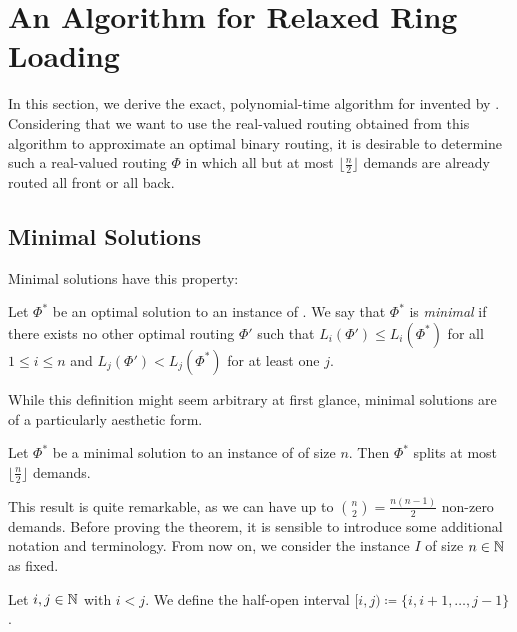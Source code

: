 \section{An Algorithm for Relaxed Ring Loading}
\label{sec:relaxed-ring-loading}

In this section, we derive the exact, polynomial-time algorithm for \RRL invented by \citet{schrijver99}.
Considering that we want to use the real-valued routing obtained from this algorithm to approximate an optimal binary routing, it is desirable to determine such a real-valued routing $\Phi$ in which all but at most $\lfloor \frac{n}{2} \rfloor$ demands are already routed all front or all back.

\subsection{Minimal Solutions}

Minimal solutions have this property:

\begin{definition}
	Let $\Phi^\ast$ be an optimal solution to an instance of \RRL.
	We say that $\Phi^\ast$ is \emph{minimal} if there exists no other optimal routing $\Phi'$ such that $L_i(\Phi') \leq L_i(\Phi^\ast)$ for all $1 \leq i \leq n$ and $L_j(\Phi') < L_j(\Phi^\ast)$ for at least one $j$.
\end{definition}
While this definition might seem arbitrary at first glance, minimal solutions are of a particularly aesthetic form.

\begin{theorem}
	\label{theo:number-of-splits}
	Let $\Phi^\ast$ be a minimal solution to an instance of \RRL of size $n$.
	Then $\Phi^\ast$ splits at most $\lfloor \frac{n}{2} \rfloor$ demands.
\end{theorem}

This result is quite remarkable, as we can have up to $\binom{n}{2} = \frac{n(n-1)}{2}$ non-zero demands.
Before proving the theorem, it is sensible to introduce some additional notation and terminology.
From now on, we consider the \RRL instance $I$ of size $n \in \mathbb{N}$ as fixed.
\begin{notation}
	Let $i, j \in \mathbb{N}$ with $i < j$.
	We define the half-open interval $[i, j) \coloneqq \{i, i+1, \ldots, j-1\}$.
\end{notation}

